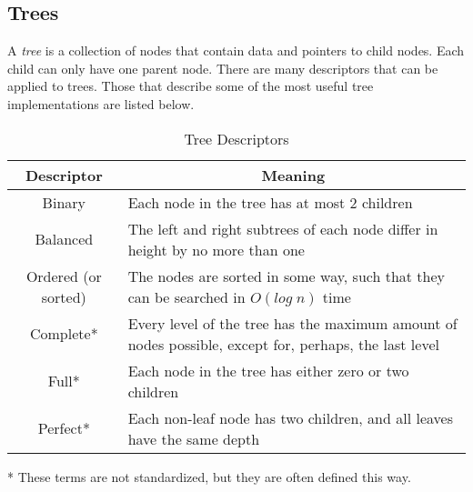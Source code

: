 
\subsection{Trees}


A \textit{tree} is a collection of nodes that contain data and pointers to child nodes. Each child can only have one parent node. There are many descriptors that can be applied to trees. Those that describe some of the most useful tree implementations are listed below.

\begin{table}[H]
	\begin{threeparttable}
		\caption{Tree Descriptors}
		\label{tab:tree}
		\begin{tabularx}{\textwidth}{|c|X|}
			\vtabularspace{2}
			\hline
			Descriptor & \multicolumn{1}{c|}{Meaning} \\
			\hline
			Binary & Each node in the tree has at most 2 children \\
			Balanced & The left and right subtrees of each node differ in height by no more than one \\
			Ordered (or sorted) & The nodes are sorted in some way, such that they can be searched in $O(log\;n)$ time \\
			Complete* & Every level of the tree has the maximum amount of nodes possible, except for, perhaps, the last level \\
			Full* & Each node in the tree has either zero or two children \\
			Perfect* & Each non-leaf node has two children, and all leaves have the same depth \\
			\hline
		\end{tabularx}
		\vspace*{1mm}
		\begin{tablenotes}\footnotesize
			\item[*] These terms are not standardized, but they are often defined this way.
		\end{tablenotes}
		\vspace*{5mm}
	\end{threeparttable}
\end{table}

